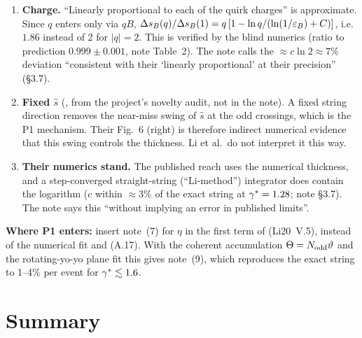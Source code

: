 \documentclass[11pt]{article}
\begin{document}
\begin{verdict}
\begin{enumerate}[leftmargin=*]
  exact there and fails only at odd crossings. The exact Nambu--Goto solution in the intermediate region (note~(6)) resolves the
  divergence.
\item \textbf{Charge.} ``Linearly proportional to each of the quirk charges'' is approximate. Since $q$ enters only via
  $qB$, $\Delta s_B(q)/\Delta s_B(1)=q\,[1-\ln q/(\ln(1/\varepsilon_B)+C)]$, i.e.\ $1.86$ instead of 2 for $|q|=2$. This is verified by the blind numerics
  (ratio to prediction $0.999\pm0.001$, note Table~2). The note calls the $\approx c\ln2\approx7\%$ deviation ``consistent
  with their `linearly proportional' at their precision'' (\S3.7).
\item \textbf{Fixed $\hat s$} (\EST{}, from the project's novelty audit, not in the note). A fixed string direction removes the
  near-miss swing of $\hat s$ at the odd crossings, which is the P1 mechanism. Their Fig.~6 (right) is therefore indirect
  numerical evidence that this swing controls the thickness. Li et al.\ do not interpret it this way.
\item \textbf{Their numerics stand.} The published reach uses the numerical thickness, and a step-converged
  straight-string (``Li-method'') integrator does contain the logarithm ($c$ within $\approx3\%$ of the exact string at
  $\gamma^*=1.28$; note \S3.7). The note says this ``without implying an error in published limits''.
\end{enumerate}
\textbf{Where P1 enters:} insert note~(7) for $\eta$ in the first term of (Li20~V.5), instead of the numerical fit and
(A.17). With the coherent accumulation $\Theta=N_{\rm odd}\vartheta$ and the rotating-yo-yo plane fit this gives note~(9), which
reproduces the exact string to 1--4\% per event for $\gamma^*\lesssim1.6$.
\end{verdict}

\section{Summary}\label{sec:summary}
\end{document}
